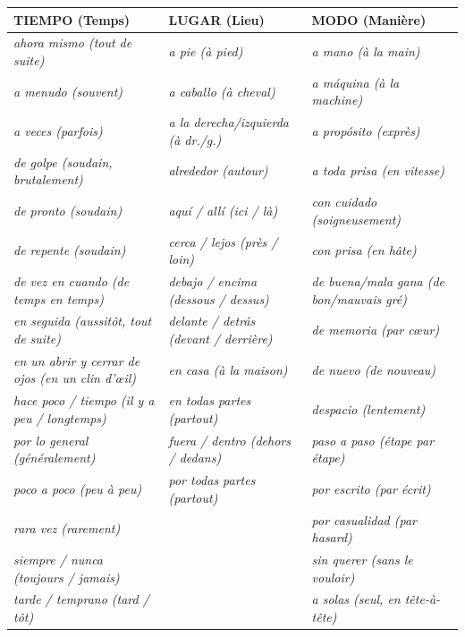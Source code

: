 \documentclass[11pt]{article}
\newcommand{\esp}[1]{\ifmmode\text{\textit{#1}}\else\begingroup\selectlanguage{spanish}\itshape #1\endgroup\fi}
\begin{document}
\begin{propriete}
\begin{center}
\begin{tabularx}{\linewidth}{|X|X|X|}
\hline
\rowcolor{popblueL} \textbf{TIEMPO (Temps)} & \textbf{LUGAR (Lieu)} & \textbf{MODO (Manière)} \\ \hline
\esp{ahora mismo} (tout de suite) & \esp{a pie} (à pied) & \esp{a mano} (à la main) \\ \hline
\esp{a menudo} (souvent) & \esp{a caballo} (à cheval) & \esp{a máquina} (à la machine) \\ \hline
\esp{a veces} (parfois) & \esp{a la derecha/izquierda} (à dr./g.) & \esp{a propósito} (exprès) \\ \hline
\esp{de golpe} (soudain, brutalement) & \esp{alrededor} (autour) & \esp{a toda prisa} (en vitesse) \\ \hline
\esp{de pronto} (soudain) & \esp{aquí / allí} (ici / là) & \esp{con cuidado} (soigneusement) \\ \hline
\esp{de repente} (soudain) & \esp{cerca / lejos} (près / loin) & \esp{con prisa} (en hâte) \\ \hline
\esp{de vez en cuando} (de temps en temps) & \esp{debajo / encima} (dessous / dessus) & \esp{de buena/mala gana} (de bon/mauvais gré) \\ \hline
\esp{en seguida} (aussitôt, tout de suite) & \esp{delante / detrás} (devant / derrière) & \esp{de memoria} (par cœur) \\ \hline
\esp{en un abrir y cerrar de ojos} (en un clin d'œil) & \esp{en casa} (à la maison) & \esp{de nuevo} (de nouveau) \\ \hline
\esp{hace poco / tiempo} (il y a peu / longtemps) & \esp{en todas partes} (partout) & \esp{despacio} (lentement) \\ \hline
\esp{por lo general} (généralement) & \esp{fuera / dentro} (dehors / dedans) & \esp{paso a paso} (étape par étape) \\ \hline
\esp{poco a poco} (peu à peu) & \esp{por todas partes} (partout) & \esp{por escrito} (par écrit) \\ \hline
\esp{rara vez} (rarement) &  & \esp{por casualidad} (par hasard) \\ \hline
\esp{siempre / nunca} (toujours / jamais) &  & \esp{sin querer} (sans le vouloir) \\ \hline
\esp{tarde / temprano} (tard / tôt) &  & \esp{a solas} (seul, en tête-à-tête) \\ \hline

\end{tabularx}
\end{center}
\end{propriete}
\end{document}
